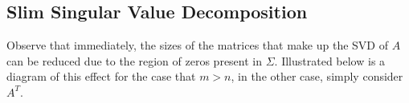 \documentclass[a4paper]{article}
\begin{document}
\subsection{Slim Singular Value Decomposition}

Observe that immediately, the sizes of the matrices that make up the SVD of $A$ can be reduced due to the region of zeros present in $\Sigma$. Illustrated below is a diagram of this effect for the case that $m>n$, in the other case, simply consider $A^T$.
\newcommand{\bigzero}{\mbox{\normalfont\Large 0}}

\begin{center}
\end{center}
\end{document}
